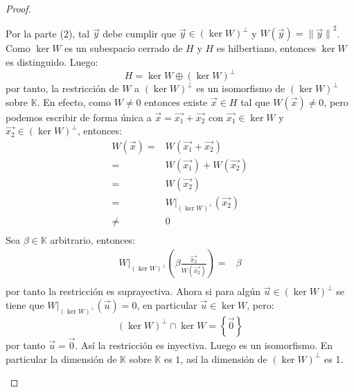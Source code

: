 \documentclass[12pt]{report}
\newcounter{it}
\theoremstyle{largebreak}
\newcommand\norm[1]{\ensuremath{\|#1\|}}
\begin{document}
\begin{proof}
\begin{enumerate}
            Por la parte (2), tal $\vec{y}$ debe cumplir que $\vec{y}\in \left(\ker W\right)^\perp$ y $W(\vec{y})=\norm{\vec{y}}^2$. Como $\ker W $ es un subespacio cerrado de $H$ y $H$ es hilbertiano, entonces $\ker W$ es distinguido. Luego:
            \begin{equation*}
                H=\ker W \oplus\left(\ker W\right)^\perp
            \end{equation*}
            por tanto, la restricción de $W$ a $\left(\ker W\right)^\perp$ es un isomorfismo de $\left(\ker W\right)^\perp$ sobre $\mathbb{K}$. En efecto, como $W\neq 0$ entonces existe $\vec{x}\in H$ tal que $W(\vec{x})\neq 0$, pero podemos escribir de forma única a $\vec{x}=\vec{x_1}+\vec{x_2}$ con $\vec{x_1}\in \ker W$ y $\vec{x_2}\in \left(\ker W\right)^\perp$, entonces:
            \begin{equation*}
                \begin{split}
                    W(\vec{x})=&W(\vec{x_1}+\vec{x_2})\\
                    =&W(\vec{x_1})+W(\vec{x_2})\\
                    =&W(\vec{x_2})\\
                    =&W\big|_{\left(\ker W\right)^\perp} (\vec{x_2})\\
                    \neq&0\\
                \end{split}
            \end{equation*}
            Sea $\beta\in\mathbb{K}$ arbitrario, entonces:
            \begin{equation*}
                \begin{split}
                    W\big|_{\left(\ker W\right)^\perp}\left(\beta\frac{\vec{x_2}}{W(\vec{x_2})} \right)=&\beta\\
                \end{split}
            \end{equation*}
            por tanto la restricción es suprayectiva. Ahora si para algún $\vec{u}\in \left(\ker W\right)^\perp$ se tiene que $W\big|_{\left(\ker W\right)^\perp}\left(\vec{u} \right)=0$, en particular $\vec{u}\in\ker W$, pero:
            \begin{equation*}
                \left(\ker W\right)^\perp\cap \ker W=\left\{\vec{0} \right\}
            \end{equation*}
            por tanto $\vec{u}=\vec{0}$. Así la restricción es inyectiva. Luego es un isomorfismo. En particular la dimensión de $\mathbb{K}$ sobre $\mathbb{K}$ es $1$, así la dimensión de $\left(\ker W\right)^\perp$ es 1.


\end{enumerate}
\end{proof}
\end{document}
